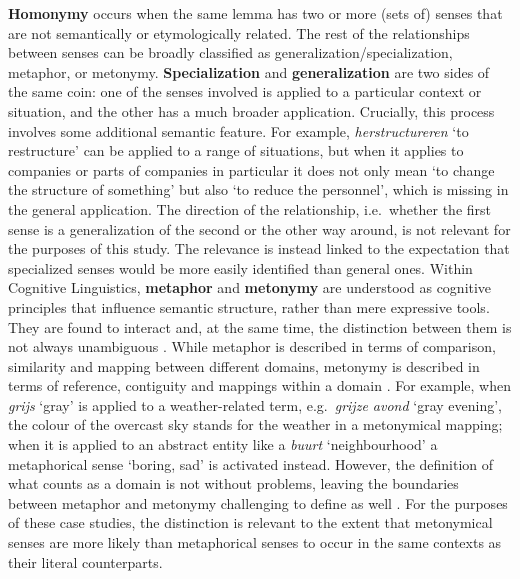 \documentclass[
]{book}
\begin{document}
\textbf{Homonymy} occurs when the same lemma has two or more (sets of) senses that are not semantically or etymologically related. The rest of the relationships between senses can be broadly classified as generalization/specialization, metaphor, or metonymy. \textbf{Specialization} and \textbf{generalization} are two sides of the same coin: one of the senses involved is applied to a particular context or situation, and the other has a much broader application. Crucially, this process involves some additional semantic feature. For example, \emph{herstructureren} `to restructure' can be applied to a range of situations, but when it applies to companies or parts of companies in particular it does not only mean `to change the structure of something' but also `to reduce the personnel', which is missing in the general application. The direction of the relationship, i.e.~whether the first sense is a generalization of the second or the other way around, is not relevant for the purposes of this study. The relevance is instead linked to the expectation that specialized senses would be more easily identified than general ones.
Within Cognitive Linguistics, \textbf{metaphor} and \textbf{metonymy} are understood as cognitive principles that influence semantic structure, rather than mere expressive tools. They are found to interact and, at the same time, the distinction between them is not always unambiguous
\autocite{lakoff.johnson_2003,barcelona_2015,lemmens_2015,geeraerts_2003}.
While metaphor is described in terms of comparison, similarity and mapping between different domains, metonymy is described in terms of reference, contiguity and mappings within a domain
\autocite{lemmens_2015}.
For example, when \emph{grijs} `gray' is applied to a weather-related term, e.g.~\emph{grijze avond} `gray evening', the colour of the overcast sky stands for the weather in a metonymical mapping; when it is applied to an abstract entity like a \emph{buurt} `neighbourhood' a metaphorical sense `boring, sad' is activated instead. However, the definition of what counts as a domain is not without problems, leaving the boundaries between metaphor and metonymy challenging to define as well \autocite{croft_2003}. For the purposes of these case studies, the distinction is relevant to the extent that metonymical senses are more likely than metaphorical senses to occur in the same contexts as their literal counterparts.
\end{document}
